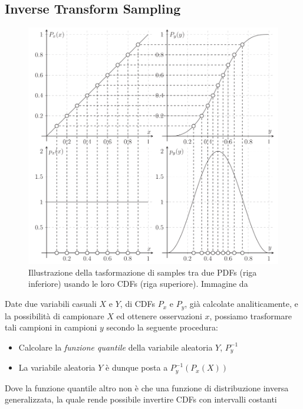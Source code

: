 \subsection{Inverse Transform Sampling}
\begin{figure}[tb]
	\centering
	\includegraphics[width=0.9\linewidth]{../assets/chapter6_sampling_inverse_transform_sampling.png}
	\caption{Illustrazione della tasformazione di samples tra due PDFs (riga inferiore) usando le loro CDFs (riga superiore). Immagine da 
		\cite{pegoraro}}
	\label{chapter6:sampling:inverseTransform}
\end{figure}
Date due variabili casuali $X$ e $Y$, di CDFs\footnotemark{} $P_x$ e $P_y$, gi\`a calcolate analiticamente, e la possibilit\`a di campionare $X$ ed 
ottenere 
osservazioni $x$, possiamo trasformare tali campioni in campioni $y$ secondo la seguente procedura:\par
\begin{itemize}[topsep=0pt,noitemsep]
	\item Calcolare la \textit{funzione quantile} della variabile aleatoria $Y$, $P_y^{-1}$
	\item La variabile aleatoria $Y$ \`e dunque posta a $P_y^{-1}(P_x(X))$
\end{itemize}
Dove la funzione quantile altro non \`e che una funzione di distribuzione inversa generalizzata, la quale rende possibile invertire CDFs con intervalli
costanti
